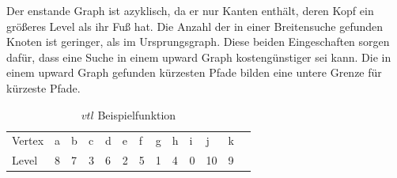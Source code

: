 Der enstande Graph ist azyklisch, da er nur Kanten enthält, deren Kopf ein größeres Level als ihr Fuß hat.
Die Anzahl der in einer Breitensuche gefunden Knoten ist geringer, als im Ursprungsgraph.
Diese beiden Eingeschaften sorgen dafür, dass eine Suche in einem upward Graph kostengünstiger sei kann.
Die in einem upward Graph gefunden kürzesten Pfade bilden eine untere Grenze für kürzeste Pfade.

\begin{table}[ht]
    \centering
    \begin{tabular}{lllllllllllll}
        Vertex & a & b & c & d & e & f & g & h & i & j  & k & \\
        Level  & 8 & 7 & 3 & 6 & 2 & 5 & 1 & 4 & 0 & 10 & 9 &
    \end{tabular}
    \caption{${vtl}$ Beispielfunktion}
    \label{ch::fig::vtl_abbildung}
\end{table}


